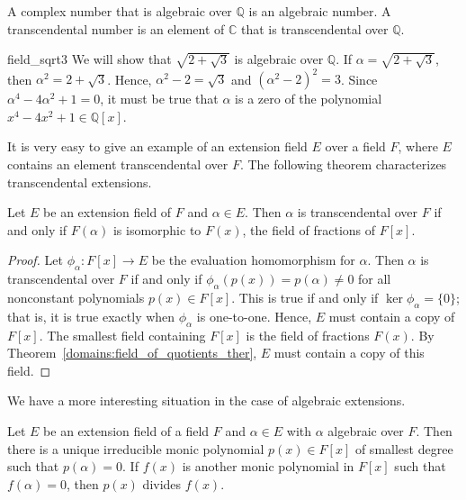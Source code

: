  
A complex number that is algebraic over ${\mathbb Q}$ is an {\bfi
algebraic number}. A {\bfi transcendental
number\/} is an element of ${\mathbb C}$ that
is transcendental over ${\mathbb Q}$.  


\begin{example}{field_sqrt3}
We will show that $\sqrt{2 + \sqrt{3} }$ is algebraic over ${\mathbb Q}$.
If $\alpha = \sqrt{2 + \sqrt{3} }$, then $\alpha^2 = 2 + \sqrt{3}$.
Hence, $\alpha^2 -  2 = \sqrt{3}$ and $( \alpha^2 -  2)^2 = 3$. Since
$\alpha^4 - 4 \alpha^2 + 1 = 0$, it must be true that $\alpha$ is a
zero of the polynomial $x^4 - 4 x^2 + 1 \in {\mathbb Q}[x]$. 
\end{example}
 

It is very easy to give an example of an extension field $E$ over a 
field $F$, where $E$ contains an element transcendental over $F$. 
The following theorem characterizes transcendental extensions. 
 

\begin{theorem}
Let $E$ be an extension field of $F$ and $\alpha \in E$. Then $\alpha$ 
is transcendental over $F$ if and only if $F( \alpha )$ is isomorphic
to $F(x)$, the field of fractions of $F[x]$.
\end{theorem}
 
 
\begin{proof}
Let $\phi_{\alpha} : F[x] \rightarrow E$ be the evaluation
homomorphism for $\alpha$. Then $\alpha$ is transcendental over 
$F$ if and only if $\phi_{\alpha} (p(x)) = p(\alpha) \neq 0$ for all 
nonconstant polynomials $p(x) \in F[x]$.  This is true if and only 
if $\ker \phi_{\alpha} = \{ 0 \}$; that is, it is true exactly when 
$\phi_{\alpha}$ is one-to-one. Hence, $E$ must contain a copy of
$F[x]$.  The smallest field containing $F[x]$ is the field of
fractions $F(x)$.  By Theorem~\ref{domains:field_of_quotients_ther}, $E$ must contain a copy of this
field.
\end{proof}


\medskip

 
We have a more interesting situation in the case of algebraic
extensions.


\begin{theorem}
Let $E$ be an extension field of a field $F$ and $\alpha \in E$ with
$\alpha$ algebraic over $F$. Then there is a unique irreducible monic
polynomial $p(x) \in F[x]$ of smallest degree such that $p( \alpha ) =
0$. If $f(x)$ is another monic polynomial in $F[x]$ such that 
$f(\alpha) = 0$, then $p(x)$ divides $f(x)$.   
\end{theorem}
 
